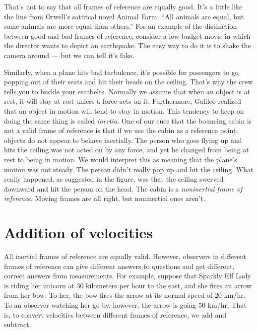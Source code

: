 That's not to say that all frames of reference are equally good. It's a little like the line from
Orwell's satirical novel Animal Farm: ``All animals are equal, but some animals are more equal than others.''
For an example of the distinction between good and bad frames of reference, consider a low-budget movie in which
the director wants to depict an earthquake.
The easy way to do it is to shake the camera around --- but we can tell it's fake.




Similarly, when a plane hits bad turbulence, it's possible for passengers to go popping out of their seats and hit their
heads on the ceiling. That's why the crew tells you to buckle your seatbelts. Normally we assume that when an
object is at rest, it will stay at rest unless a force acts on it. Furthermore, Galileo realized that
an object in motion will tend
to stay in motion. This tendency to keep on doing the same thing is called \emph{inertia}.
One of our cues that the bouncing cabin is not a valid frame of reference is that if we use the cabin as a
reference point, objects do not appear to behave inertially. The person who goes flying up and hits the ceiling
was not acted on by any force, and yet he changed from being at rest to being in motion. We would interpret this
as meaning that the plane's motion was not steady. The person didn't really pop up and hit the ceiling. What really
happened, as suggested in the figure, was that the ceiling swerved downward and hit the person on the head. The cabin is a \emph{noninertial frame
of reference}. Moving frames are all right, but noninertial ones aren't.

\section{Addition of velocities}\label{sec:galilean-velocity-addition}

All inertial frames of reference are equally valid. However, observers in different frames of reference
can give different answers to questions and get different, correct answers from measurements. For example,
suppose that Sparkly Elf Lady is riding her unicorn at 30 kilometers per hour to the east, and she fires
an arrow from her bow. To her, the bow fires the arrow at its normal speed of 20 km/hr. To an observer
watching her go by, however, the arrow is going 50 km/hr. That is, to convert velocities between different
frames of reference, we add and subtract.

